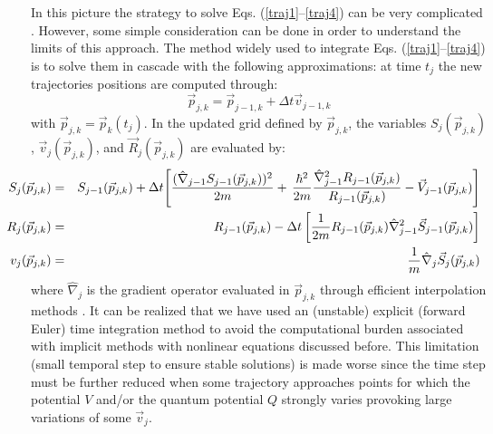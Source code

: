 \documentclass[nofootinbib, secnumarabic, amsmath, nobibnotes,11pt,aps,pra, floatfix]{revtex4-1}
\begin{document}
In this picture the strategy to solve Eqs. (\ref{traj1}--\ref{traj4})
can be very complicated \cite{om.Wyatt1, om.Wyatt2, om.Wyatt3,
om.Frederick}. However, some simple consideration can be done in
order to understand the limits of this approach. The method widely
used \cite{om.Wyatt1, om.Wyatt2, om.Wyatt3, om.Frederick} to
integrate Eqs. (\ref{traj1}--\ref{traj4}) is to solve them in
cascade with the following approximations: at time $t_{j}$ the new
trajectories positions are computed through:
\begin{equation}
\vec {p}_{j,k} = \vec {p}_{j-1,k} + \Delta t\vec {v}_{j - 1,k}
\end{equation}
with $\vec {p}_{j,k} = \vec {p}_{k}(t_j)$. In the updated grid defined by $\vec {p}_{j,k}$, the variables ${S}_{j}(\vec {p}_{j,k})$, $\vec {v}_{j}(\vec {p}_{j,k})$, and $\vec {R}_{j}(\vec {p}_{j,k})$ are evaluated by:
\begin{eqnarray}
\hspace*{-24pt}{S}_{j}(\vec {p}_{j,k}) & =& {S}_{j - 1}(\vec {p}_{j,k}) + \Delta t\Bigg[ \frac{(\hat{\nabla}%
_{j - 1} {S}_{j - 1}(\vec {p}_{j,k}))^{2}}{2m}+\, \frac{\hbar^{2}}{2m}\frac{\hat{\nabla
}_{j - 1}^{2}{R}_{j - 1}(\vec {p}_{j,k})}{{R}_{j - 1}(\vec {p}_{j,k})} - \vec {V}_{j - 1}(\vec {p}_{j,k})\Bigg]\nonumber\\
\hspace*{-24pt}{R}_{j}(\vec {p}_{j,k}) & = &{R}_{j - 1}(\vec {p}_{j,k}) - \Delta t\left[ \frac{1}{2m}%
{R}_{j - 1}(\vec {p}_{j,k})\hat{\nabla}_{j - 1}^{2}\vec {S}_{j - 1}(\vec {p}_{j,k})\right] \nonumber\\
\hspace*{-24pt}{v}_{j}(\vec {p}_{j,k}) & = &\frac{1}{m}\hat{\nabla}_{j}\vec {S}_{j}(\vec {p}_{j,k})\nonumber%
\end{eqnarray}
where $\hat{\nabla}_{j}$ is the gradient operator evaluated in $\vec {p}_{j,k}$ through efficient interpolation methods \cite{om.Wyatt1, om.Wyatt2, om.Wyatt3, om.Frederick}. It can be realized that we have used an (unstable) explicit (forward Euler) time integration method
 \cite{om.Striwerda} to avoid the computational burden associated with implicit methods with nonlinear equations discussed before. This limitation (small temporal step to ensure stable solutions) is made worse since the time step must be further reduced when some trajectory approaches points for which the potential $V$ and/or the quantum potential $Q$ strongly varies provoking large variations of some $\vec{v}_{j}$.
\end{document}
